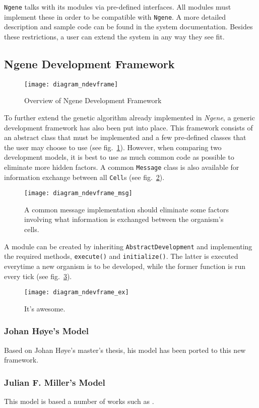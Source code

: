 \texttt{Ngene} talks with its modules via pre-defined interfaces. All modules must implement these in order to be compatible with \texttt{Ngene}. A more detailed description and sample code can be found in the system documentation. Besides these restrictions, a user can extend the system in any way they see fit.


\subsection{Ngene Development Framework}
\begin{figure}[ht]
	\centering
	\texttt{[image: diagram\_ndevframe]}
	\caption{Overview of Ngene Development Framework}
	\label{fig:diagram_ndevframe}
\end{figure}

To further extend the genetic algorithm already implemented in \emph{Ngene}, a generic development framework has also been put into place. This framework consists of an abstract class that must be implemented and a few pre-defined classes that the user may choose to use (see fig.~\ref{fig:diagram_ndevframe}). However, when comparing two development models, it is best to use as much common code as possible to eliminate more hidden factors. A common \texttt{Message} class is also available for information exchange between all \texttt{Cell}s (see fig.~\ref{fig:diagram_ndevframe_msg}).

\begin{figure}[ht]
	\centering
	\texttt{[image: diagram\_ndevframe\_msg]}
	\caption{A common message implementation should eliminate some factors involving what information is exchanged between the organism's cells.}
	\label{fig:diagram_ndevframe_msg}
\end{figure}

A module can be created by inheriting \texttt{AbstractDevelopment} and implementing the required methods, \texttt{execute()} and \texttt{initialize()}. The latter is executed everytime a new organism is to be developed, while the former function is run every tick (see fig.~\ref{fig:diagram_ndevframe_ex}). 

\begin{figure}[ht]
	\centering
	\texttt{[image: diagram\_ndevframe\_ex]}
	\caption{It's awesome.}
	\label{fig:diagram_ndevframe_ex}
\end{figure}


\subsubsection{Johan H{\o}ye's Model}
Based on Johan H{\o}ye's master's thesis\cite{hoye2006}, his model has been ported to this new framework.


\subsubsection{Julian F. Miller's Model}
This model is based a number of works such as \cite{ecal2003}.

